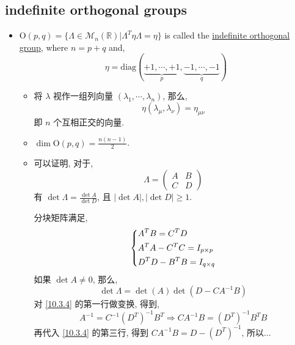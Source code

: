 \subsection{indefinite orthogonal groups}
\begin{itemize}
	\item $\mathrm{O}(p, q) = \{\Lambda \in \mathcal{M}_n(\mathbb{R}) | \Lambda^T \eta \Lambda = \eta\}$ is called the \href{https://en.wikipedia.org/wiki/Indefinite_orthogonal_group}{indefinite orthogonal group}, where $n = p + q$ and,
	\begin{equation}
		\eta = \mathrm{diag}(\underbrace{+ 1, \cdots, + 1}_{p}, \underbrace{- 1, \cdots, - 1}_{q})
	\end{equation}
	\begin{itemize}
		\item 将 $\lambda$ 视作一组列向量 $(\lambda_1, \cdots, \lambda_n)$, 那么,
		\begin{equation}
			\eta(\lambda_\mu, \lambda_\nu) = \eta_{\mu \nu}
		\end{equation}
		即 $n$ 个互相正交的向量.
		
		\item $\dim \mathrm{O}(p, q) = \frac{n (n - 1)}{2}$.
		
		\item 可以证明, 对于,
		\begin{equation}
			\Lambda = \begin{pmatrix}
				A & B \\
				C & D
			\end{pmatrix}
		\end{equation}
		有 $\det \Lambda = \frac{\det A}{\det D}$, 且 $|\det A|, |\det D| \geq 1$.
		
		\begin{tcolorbox}[title=proof:]
			分块矩阵满足,
			\begin{equation} \label{10.3.4}
				\begin{dcases}
					A^T B = C^T D \\
					A^T A - C^T C = I_{p \times p} \\
					D^T D - B^T B = I_{q \times q}
				\end{dcases}
			\end{equation}
			如果 $\det A \neq 0$, 那么,
			\begin{equation}
				\det \Lambda = \det(A) \det(D - C A^{- 1} B)
			\end{equation}
			对 \eqref{10.3.4} 的第一行做变换, 得到,
			\begin{equation}
				A^{- 1} = C^{- 1} (D^T)^{- 1} B^T \Longrightarrow C A^{- 1} B = (D^T)^{- 1} B^T B
			\end{equation}
			再代入 \eqref{10.3.4} 的第三行, 得到 $C A^{- 1} B = D - (D^T)^{- 1}$, 所以...
			

\end{tcolorbox}
\end{itemize}
\end{itemize}
